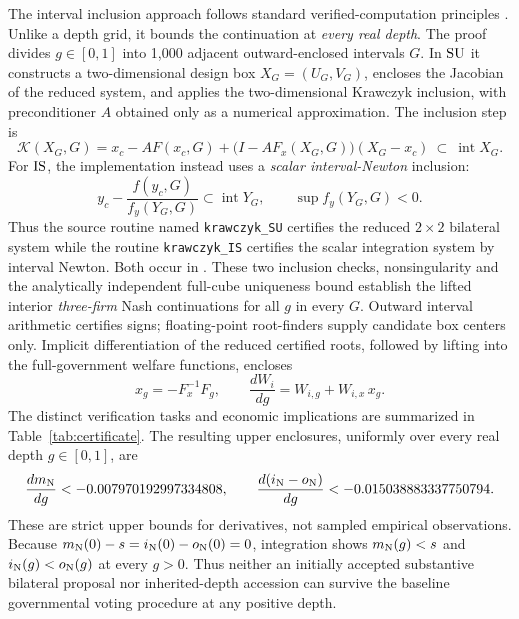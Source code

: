 The interval inclusion approach follows standard verified-computation principles \citep{Rump2010}. Unlike a depth grid, it bounds the continuation at \emph{every real depth}. The proof divides $g\in[0,1]$ into 1,000 adjacent outward-enclosed intervals $G$. In $\mathrm{SU}$ it constructs a two-dimensional design box $X_G=(U_G,V_G)$, encloses the Jacobian of the reduced system, and applies the two-dimensional Krawczyk inclusion, with preconditioner $A$ obtained only as a numerical approximation. The inclusion step is
\begin{equation}\label{eq:kraw}
\mathcal K(X_G,G)=x_c-AF(x_c,G)+\bigl(I-AF_x(X_G,G)\bigr)(X_G-x_c)\ \subset\ \operatorname{int}X_G.
\end{equation}
For $\mathrm{IS}$, the implementation instead uses a \emph{scalar interval-Newton} inclusion:
\begin{equation}\label{eq:scalarnewton}
y_c-\frac{f(y_c,G)}{f_y(Y_G,G)}\subset\operatorname{int}Y_G,
\qquad \sup f_y(Y_G,G)<0.
\end{equation}
Thus the source routine named \texttt{krawczyk\_SU} certifies the reduced $2\times2$ bilateral system while the routine \texttt{krawczyk\_IS} certifies the scalar integration system by interval Newton. Both occur in . These two inclusion checks, nonsingularity and the analytically independent full-cube uniqueness bound establish the lifted interior \emph{three-firm} Nash continuations for all $g$ in every $G$. Outward interval arithmetic certifies signs; floating-point root-finders supply candidate box centers only. Implicit differentiation of the reduced certified roots, followed by lifting into the full-government welfare functions, encloses
\begin{equation}\label{eq:totalder}
x_g=-F_x^{-1}F_g,\qquad
\frac{dW_i}{dg}=W_{i,g}+W_{i,x}\,x_g.
\end{equation}
The distinct verification tasks and economic implications are summarized in Table~\ref{tab:certificate}. The resulting upper enclosures, uniformly over every real depth $g\in[0,1]$, are
\begin{equation}\label{eq:certmargins}
\frac{d m_{\mathrm{N}}}{dg}<-0.007970192997334808,\qquad
\frac{d(i_{\mathrm{N}}-o_{\mathrm{N}})}{dg}<-0.015038883337750794.
\end{equation}
These are strict upper bounds for derivatives, not sampled empirical observations. Because $m_{\mathrm{N}}(0)-s=i_{\mathrm{N}}(0)-o_{\mathrm{N}}(0)=0$, integration shows $m_{\mathrm{N}}(g)<s$ and $i_{\mathrm{N}}(g)<o_{\mathrm{N}}(g)$ at every $g>0$. Thus neither an initially accepted substantive bilateral proposal nor inherited-depth accession can survive the baseline governmental voting procedure at any positive depth.

